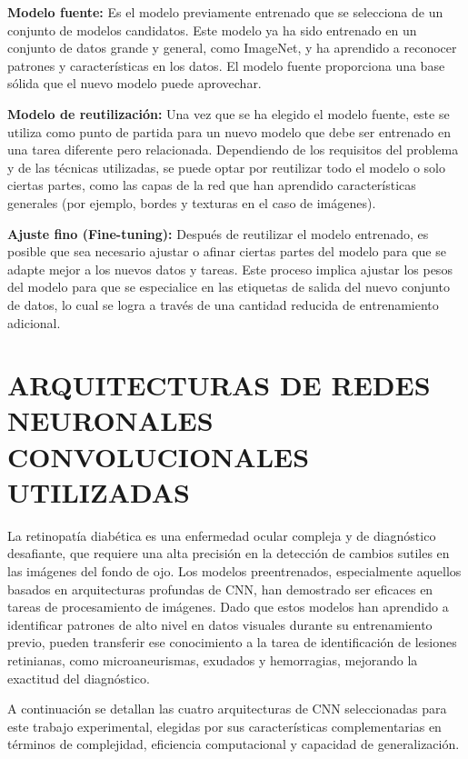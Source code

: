 \textbf{Modelo fuente:} Es el modelo previamente entrenado que se selecciona de un
conjunto de modelos candidatos. Este modelo ya ha sido entrenado en un conjunto de datos
grande y general, como ImageNet, y ha aprendido a reconocer patrones y características en
los datos. El modelo fuente proporciona una base sólida que el nuevo modelo puede
aprovechar.

\textbf{Modelo de reutilización:} Una vez que se ha elegido el modelo fuente, este se
utiliza como punto de partida para un nuevo modelo que debe ser entrenado en una tarea
diferente pero relacionada. Dependiendo de los requisitos del problema y de las técnicas
utilizadas, se puede optar por reutilizar todo el modelo o solo ciertas partes, como las
capas de la red que han aprendido características generales (por ejemplo, bordes y
texturas en el caso de imágenes).

\textbf{Ajuste fino (Fine-tuning):} Después de reutilizar el modelo entrenado, es posible
que sea necesario ajustar o afinar ciertas partes del modelo para que se adapte mejor a
los nuevos datos y tareas. Este proceso implica ajustar los pesos del modelo para que se
especialice en las etiquetas de salida del nuevo conjunto de datos, lo cual se logra a
través de una cantidad reducida de entrenamiento adicional.



\section{ARQUITECTURAS DE REDES NEURONALES CONVOLUCIONALES UTILIZADAS} \label{sec:arquitecturas-cnn}

La retinopatía diabética es una enfermedad ocular compleja y de diagnóstico desafiante,
que requiere una alta precisión en la detección de cambios sutiles en las imágenes del
fondo de ojo. Los modelos preentrenados, especialmente aquellos basados en arquitecturas
profundas de CNN, han demostrado ser eficaces en
tareas de procesamiento de imágenes. Dado que estos modelos han aprendido a identificar
patrones de alto nivel en datos visuales durante su entrenamiento previo, pueden
transferir ese conocimiento a la tarea de identificación de lesiones retinianas, como
microaneurismas, exudados y hemorragias, mejorando la exactitud del diagnóstico.

A continuación se detallan las cuatro arquitecturas de CNN seleccionadas para este
trabajo experimental, elegidas por sus características complementarias en términos de
complejidad, eficiencia computacional y capacidad de generalización.

